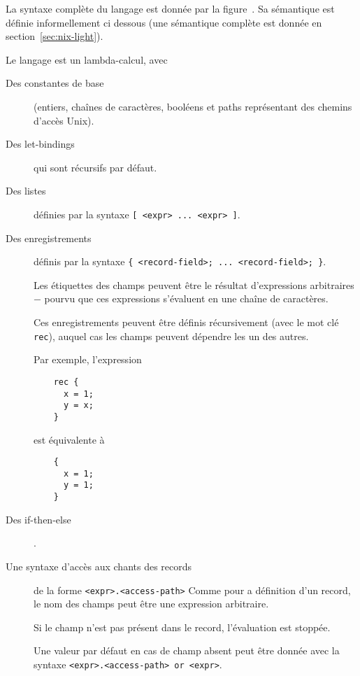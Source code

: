 La syntaxe complète du langage est donnée par la figure .
Sa sémantique est définie informellement ci dessous (une sémantique complète
est donnée en section \ref{sec:nix-light}).

Le langage est un lambda-calcul, avec

\begin{description}
  \item[Des constantes de base] (entiers, chaînes de caractères, booléens et
    paths représentant des chemins d'accès Unix).

  \item[Des let-bindings] qui sont récursifs par défaut.

  \item[Des listes] définies par la syntaxe \lstinline{[ <expr> ... <expr> ]}.

  \item[Des enregistrements] définis par la syntaxe
    \lstinline|{ <record-field>; ... <record-field>; }|. %

    Les étiquettes des champs peuvent être le résultat d'expressions
    arbitraires − pourvu que ces expressions s'évaluent en une chaîne de
    caractères.

    Ces enregistrements peuvent être définis récursivement (avec le mot clé
    \lstinline{rec}), auquel cas les champs peuvent dépendre les un des autres.

    Par exemple, l'expression

    \begin{lstlisting}
    rec {
      x = 1;
      y = x;
    }
    \end{lstlisting}
    est équivalente à
    \begin{lstlisting}
    {
      x = 1;
      y = 1;
    }
    \end{lstlisting}

  \item[Des if-then-else].

  \item[Une syntaxe d'accès aux chants des records] de la forme
    \lstinline{<expr>.<access-path>}
    Comme pour a définition d'un record, le nom des champs peut être une
    expression arbitraire.

    Si le champ n'est pas présent dans le record, l'évaluation est stoppée.

    Une valeur par défaut en cas de champ absent peut être donnée avec la
    syntaxe \lstinline{<expr>.<access-path> or <expr>}.


\end{description}
